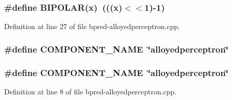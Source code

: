 \subsubsection[{BIPOLAR}]{\setlength{\rightskip}{0pt plus 5cm}\#define BIPOLAR(x)~(((x)$<$$<$1)-1)}\label{bpred-alloyedperceptron_8cpp_d1289ccac63a964f638d03575fed7697}




Definition at line 27 of file bpred-alloyedperceptron.cpp.
\subsubsection[{COMPONENT\_\-NAME}]{\setlength{\rightskip}{0pt plus 5cm}\#define COMPONENT\_\-NAME~\char`\"{}alloyedperceptron\char`\"{}}\label{zesto-bpred_8cpp_9146ade7ce24e3db226a973a59063892}


\subsubsection[{COMPONENT\_\-NAME}]{\setlength{\rightskip}{0pt plus 5cm}\#define COMPONENT\_\-NAME~\char`\"{}alloyedperceptron\char`\"{}}\label{bpred-alloyedperceptron_8cpp_9146ade7ce24e3db226a973a59063892}




Definition at line 8 of file bpred-alloyedperceptron.cpp.